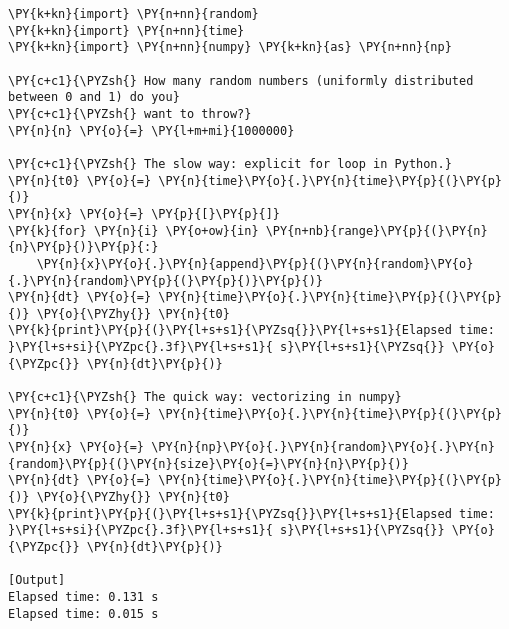 \begin{Verbatim}[label=\makebox{\url{https://bitbucket.org/lbaldini/programming/src/tip/snippets/vectorization.py}},commandchars=\\\{\}]
\PY{k+kn}{import} \PY{n+nn}{random}
\PY{k+kn}{import} \PY{n+nn}{time}
\PY{k+kn}{import} \PY{n+nn}{numpy} \PY{k+kn}{as} \PY{n+nn}{np}

\PY{c+c1}{\PYZsh{} How many random numbers (uniformly distributed between 0 and 1) do you}
\PY{c+c1}{\PYZsh{} want to throw?}
\PY{n}{n} \PY{o}{=} \PY{l+m+mi}{1000000}

\PY{c+c1}{\PYZsh{} The slow way: explicit for loop in Python.}
\PY{n}{t0} \PY{o}{=} \PY{n}{time}\PY{o}{.}\PY{n}{time}\PY{p}{(}\PY{p}{)}
\PY{n}{x} \PY{o}{=} \PY{p}{[}\PY{p}{]}
\PY{k}{for} \PY{n}{i} \PY{o+ow}{in} \PY{n+nb}{range}\PY{p}{(}\PY{n}{n}\PY{p}{)}\PY{p}{:}
    \PY{n}{x}\PY{o}{.}\PY{n}{append}\PY{p}{(}\PY{n}{random}\PY{o}{.}\PY{n}{random}\PY{p}{(}\PY{p}{)}\PY{p}{)}
\PY{n}{dt} \PY{o}{=} \PY{n}{time}\PY{o}{.}\PY{n}{time}\PY{p}{(}\PY{p}{)} \PY{o}{\PYZhy{}} \PY{n}{t0}
\PY{k}{print}\PY{p}{(}\PY{l+s+s1}{\PYZsq{}}\PY{l+s+s1}{Elapsed time: }\PY{l+s+si}{\PYZpc{}.3f}\PY{l+s+s1}{ s}\PY{l+s+s1}{\PYZsq{}} \PY{o}{\PYZpc{}} \PY{n}{dt}\PY{p}{)}

\PY{c+c1}{\PYZsh{} The quick way: vectorizing in numpy}
\PY{n}{t0} \PY{o}{=} \PY{n}{time}\PY{o}{.}\PY{n}{time}\PY{p}{(}\PY{p}{)}
\PY{n}{x} \PY{o}{=} \PY{n}{np}\PY{o}{.}\PY{n}{random}\PY{o}{.}\PY{n}{random}\PY{p}{(}\PY{n}{size}\PY{o}{=}\PY{n}{n}\PY{p}{)}
\PY{n}{dt} \PY{o}{=} \PY{n}{time}\PY{o}{.}\PY{n}{time}\PY{p}{(}\PY{p}{)} \PY{o}{\PYZhy{}} \PY{n}{t0}
\PY{k}{print}\PY{p}{(}\PY{l+s+s1}{\PYZsq{}}\PY{l+s+s1}{Elapsed time: }\PY{l+s+si}{\PYZpc{}.3f}\PY{l+s+s1}{ s}\PY{l+s+s1}{\PYZsq{}} \PY{o}{\PYZpc{}} \PY{n}{dt}\PY{p}{)}

[Output]
Elapsed time: 0.131 s
Elapsed time: 0.015 s
\end{Verbatim}
